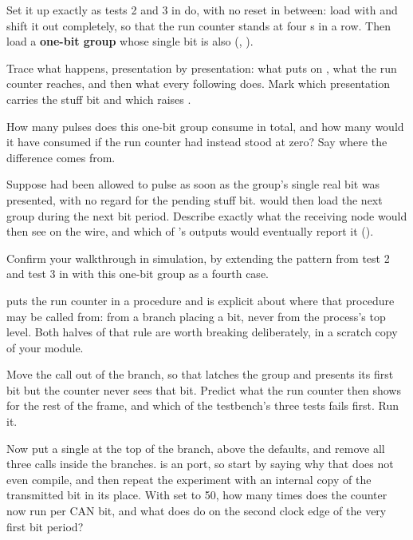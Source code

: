Set it up exactly as tests 2 and 3 in  do, with no reset in between: load
 with  and shift it out completely, so that the run counter
stands at four s in a row. Then load a \textbf{one-bit group} whose single bit is also
 (, ).

 Trace what happens, presentation by presentation: what  puts on ,
what the run counter reaches, and then what every following  does. Mark which
presentation carries the stuff bit and which raises .

 How many  pulses does this one-bit group consume in total, and how many would
it have consumed if the run counter had instead stood at zero? Say where the difference comes from.

 Suppose  had been allowed to pulse as soon as the group's single real bit was
presented, with no regard for the pending stuff bit.  would then load the next
group during the next bit period. Describe exactly what the receiving node would then see on the
wire, and which of 's outputs would eventually report it ().

 Confirm your walkthrough in simulation, by extending the pattern from test 2 and test 3 in
 with this one-bit group as a fourth case.

\label{c14:ex:trackrun}
 puts the run counter in a procedure and is explicit about where that
procedure may be called from: from a branch placing a bit, never from the process's top level. Both
halves of that rule are worth breaking deliberately, in a scratch copy of your module.

 Move the call  out of the  branch, so that 
latches the group and presents its first bit but the counter never sees that bit. Predict what the
run counter then shows for the rest of the frame, and which of the testbench's three tests fails
first. Run it.

 Now put a single  at the top of the
 branch, above the defaults, and remove all three calls inside the
branches.  is an  port, so start by saying why that does not even compile, and
then repeat the experiment with an internal copy of the transmitted bit in its place. With
 set to 50, how many times does the counter now run per CAN bit, and what does
 do on the second clock edge of the very first bit period?

